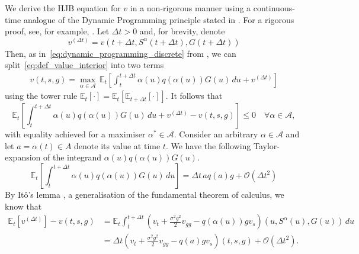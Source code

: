 \documentclass[main.tex]{subfiles}
\begin{document}
We derive the HJB equation for $v$ in a non-rigorous manner
using a
continuous-time analogue of the Dynamic Programming principle
stated in . For a rigorous proof,
see, for example, \citet[Ch.~3]{pham2009continuous}.
Let $\Delta{t}>0$ and, for brevity, denote
\begin{equation}
  v^{(\Delta{t})} =
  v(t+\Delta{t},S^\alpha(t+\Delta{t}),G(t+\Delta{t}))
\end{equation}
Then, as in~\eqref{eq:dynamic_programming_discrete} from
, we can
split~\eqref{eq:def_value_interior} into two terms
\begin{align}
  v(t,s,g) = \max_{\alpha\in\mathcal{A}}\,
  \mathbb{E}_{t}\left[
  \int_t^{t+\Delta{t}} \alpha(u)q(\alpha(u))G(u)\,du
  + v^{(\Delta{t})}\right]
\end{align}
using the tower rule $\mathbb{E}_t[\cdot] = \mathbb{E}_t[\mathbb{E}_{t+\Delta{t}}[\cdot]]$.
It follows that
\begin{equation}
  \label{eq:cts_bellman_principle_ineq}
  \mathbb{E}_{t}\left[
    \int_t^{t+\Delta{t}} \alpha(u)q(\alpha(u))G(u)\,du
    + v^{(\Delta{t})}-v(t,s,g)\right]
  \leq 0\quad  \forall \alpha\in\mathcal{A},
\end{equation}
with equality achieved for a maximiser $\alpha^*\in\mathcal{A}$.
Consider an arbitrary $\alpha\in\mathcal{A}$ and let $a=\alpha(t)\in
A$ denote its value at time $t$.
We have the following Taylor-expansion of the
integrand $\alpha(u)q(\alpha(u))G(u)$.
\begin{equation}
  \mathbb{E}_{t}\left[
    \int_t^{t+\Delta{t}}
    \alpha(u)q(\alpha(u))G(u)\,du\right]
  = \Delta{t}\,aq(a)g  + \mathcal{O}({\Delta{t}}^2)
\end{equation}
By It\^{o}'s lemma \citep[Ch.~1]{pham2009continuous}, a
generalisation of the fundamental theorem of calculus, we know that
\begin{align}
  \mathbb{E}_t[v^{(\Delta{t})}]-v(t,s,g)
  &= \mathbb{E}_t  \int_t^{t+\Delta{t}}
    (v_t
    +{\textstyle\frac{\sigma^2g^2}{2}}
    v_{gg}
    -q(\alpha(u))g v_s)(u,S^{\alpha}(u),G(u))
    \,du\\
  &= \Delta{t}\left( v_t
    +{\textstyle\frac{\sigma^2g^2}{2}}
    v_{gg}
    -q(a)g v_s \right)(t,s,g) + \mathcal{O}({\Delta{t}}^2).
\end{align}
\end{document}
